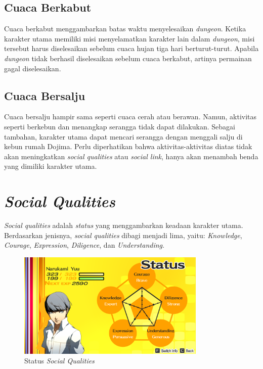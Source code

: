 \subsection{Cuaca Berkabut}
Cuaca berkabut menggambarkan batas waktu menyelesaikan \textit{dungeon}. Ketika karakter utama memiliki misi menyelamatkan karakter lain dalam \textit{dungeon}, misi tersebut harus diselesaikan sebelum cuaca hujan tiga hari berturut-turut. Apabila \textit{dungeon} tidak berhasil diselesaikan sebelum cuaca berkabut, artinya permainan gagal diselesaikan.

\subsection{Cuaca Bersalju}
Cuaca bersalju hampir sama seperti cuaca cerah atau berawan. Namun, aktivitas seperti berkebun dan menangkap serangga tidak dapat dilakukan. Sebagai tambahan, karakter utama dapat mencari serangga dengan menggali salju di kebun rumah Dojima. Perlu diperhatikan bahwa aktivitas-aktivitas diatas tidak akan meningkatkan \textit{social qualities} atau \textit{social link}, hanya akan menambah benda yang dimiliki karakter utama.


\section{\label{socialqualities}\textit{Social Qualities}}
\textit{Social qualities} adalah \textit{status} yang menggambarkan keadaan karakter utama. Berdasarkan jenisnya, \textit{social qualities} dibagi menjadi lima, yaitu: \textit{Knowledge}, \textit{Courage}, \textit{Expression}, \textit{Diligence}, dan \textit{Understanding}.

\pagebreak
\begin{figure}[htbp]
    \centering
    \includegraphics[width=0.8\textwidth]{resources/Dokumentasi/Screenshot (460).png}
    \caption{\label{socialstats}Status \textit{Social Qualities}}
\end{figure}

